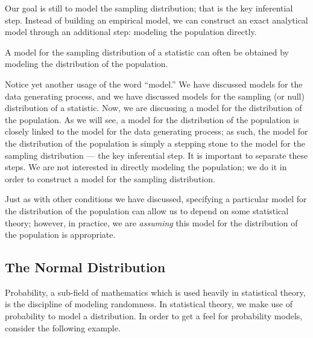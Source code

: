 \documentclass[
  letterpaper,
  DIV=11,
  numbers=noendperiod]{scrreprt}
\theoremstyle{plain}
\theoremstyle{definition}
\theoremstyle{definition}
\theoremstyle{remark}
\begin{document}
Our goal is still to model the sampling distribution; that is the key
inferential step. Instead of building an empirical model, we can
construct an exact analytical model through an additional step: modeling
the population directly.

\begin{tcolorbox}[enhanced jigsaw, breakable, titlerule=0mm, colframe=quarto-callout-tip-color-frame, bottomtitle=1mm, opacityback=0, rightrule=.15mm, toptitle=1mm, arc=.35mm, bottomrule=.15mm, left=2mm, title=\textcolor{quarto-callout-tip-color}{\faLightbulb}\hspace{0.5em}{Big Idea}, leftrule=.75mm, coltitle=black, toprule=.15mm, colbacktitle=quarto-callout-tip-color!10!white, colback=white, opacitybacktitle=0.6]

A model for the sampling distribution of a statistic can often be
obtained by modeling the distribution of the population.

\end{tcolorbox}

Notice yet another usage of the word ``model.'' We have discussed models
for the data generating process, and we have discussed models for the
sampling (or null) distribution of a statistic. Now, we are discussing a
model for the distribution of the population. As we will see, a model
for the distribution of the population is closely linked to the model
for the data generating process; as such, the model for the distribution
of the population is simply a stepping stone to the model for the
sampling distribution --- the key inferential step. It is important to
separate these steps. We are not interested in directly modeling the
population; we do it in order to construct a model for the sampling
distribution.

Just as with other conditions we have discussed, specifying a particular
model for the distribution of the population can allow us to depend on
some statistical theory; however, in practice, we are \emph{assuming}
this model for the distribution of the population is appropriate.

\subsection{The Normal Distribution}\label{the-normal-distribution}

Probability, a sub-field of mathematics which is used heavily in
statistical theory, is the discipline of modeling randomness. In
statistical theory, we make use of probability to model a distribution.
In order to get a feel for probability models, consider the following
example.
\end{document}
